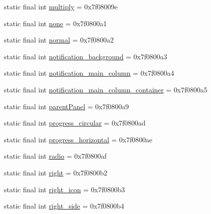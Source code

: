 \begin{DoxyCompactItemize}
\item 
static final int \mbox{\hyperlink{classandroid_1_1support_1_1v7_1_1appcompat_1_1_r_1_1id_a14cfaf6f4360cc8f1e3332ec93886e86}{multiply}} = 0x7f08009e
\item 
static final int \mbox{\hyperlink{classandroid_1_1support_1_1v7_1_1appcompat_1_1_r_1_1id_a2b9b27749df31be95628596f649f3ca6}{none}} = 0x7f0800a1
\item 
static final int \mbox{\hyperlink{classandroid_1_1support_1_1v7_1_1appcompat_1_1_r_1_1id_a01096d8e5c89f3536cd9ff277e50aa6d}{normal}} = 0x7f0800a2
\item 
static final int \mbox{\hyperlink{classandroid_1_1support_1_1v7_1_1appcompat_1_1_r_1_1id_a9bbdf5432a3500d33bbeb37a51058389}{notification\+\_\+background}} = 0x7f0800a3
\item 
static final int \mbox{\hyperlink{classandroid_1_1support_1_1v7_1_1appcompat_1_1_r_1_1id_a73287491f4ceeb078845e8636a6635f1}{notification\+\_\+main\+\_\+column}} = 0x7f0800a4
\item 
static final int \mbox{\hyperlink{classandroid_1_1support_1_1v7_1_1appcompat_1_1_r_1_1id_a2bcf1e74994a4638238f397ad0922686}{notification\+\_\+main\+\_\+column\+\_\+container}} = 0x7f0800a5
\item 
static final int \mbox{\hyperlink{classandroid_1_1support_1_1v7_1_1appcompat_1_1_r_1_1id_a908539fdb58bb6e7cbd117c4fa035dab}{parent\+Panel}} = 0x7f0800a9
\item 
static final int \mbox{\hyperlink{classandroid_1_1support_1_1v7_1_1appcompat_1_1_r_1_1id_a78d6f86a1eb6df15a9a5c3b5afb779cf}{progress\+\_\+circular}} = 0x7f0800ad
\item 
static final int \mbox{\hyperlink{classandroid_1_1support_1_1v7_1_1appcompat_1_1_r_1_1id_a9a5f8b44cd3e0ce5f6792da6c4a7189d}{progress\+\_\+horizontal}} = 0x7f0800ae
\item 
static final int \mbox{\hyperlink{classandroid_1_1support_1_1v7_1_1appcompat_1_1_r_1_1id_a0e1e03a536bddb0929ed81811e746003}{radio}} = 0x7f0800af
\item 
static final int \mbox{\hyperlink{classandroid_1_1support_1_1v7_1_1appcompat_1_1_r_1_1id_ab6d3c28d15e1a872e2e91fd4f21bdb73}{right}} = 0x7f0800b2
\item 
static final int \mbox{\hyperlink{classandroid_1_1support_1_1v7_1_1appcompat_1_1_r_1_1id_a1104bdea860d307012bf8f534ece89d7}{right\+\_\+icon}} = 0x7f0800b3
\item 
static final int \mbox{\hyperlink{classandroid_1_1support_1_1v7_1_1appcompat_1_1_r_1_1id_aba43ec3cde39bb68e15b155b4ba2a313}{right\+\_\+side}} = 0x7f0800b4

\end{DoxyCompactItemize}
